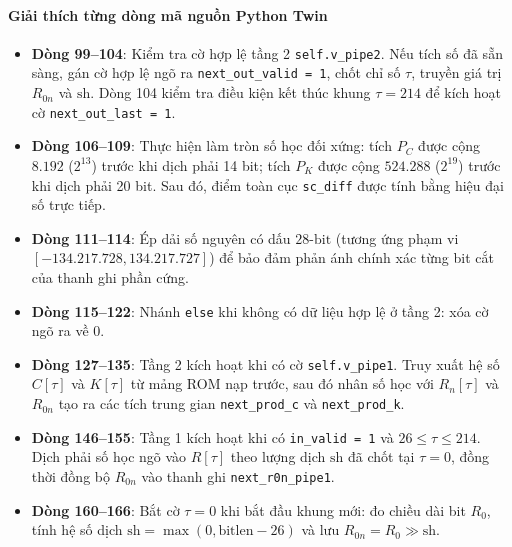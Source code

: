 \paragraph{Giải thích từng dòng mã nguồn Python Twin}
\begin{itemize}[leftmargin=1.5em]
    \item \textbf{Dòng 99--104}: Kiểm tra cờ hợp lệ tầng 2 \texttt{self.v\_pipe2}. Nếu tích số đã sẵn sàng, gán cờ hợp lệ ngõ ra \texttt{next\_out\_valid = 1}, chốt chỉ số $\tau$, truyền giá trị $R_{0n}$ và $\text{sh}$. Dòng 104 kiểm tra điều kiện kết thúc khung $\tau = 214$ để kích hoạt cờ \texttt{next\_out\_last = 1}.
    \item \textbf{Dòng 106--109}: Thực hiện làm tròn số học đối xứng: tích $P_C$ được cộng $8.192$ ($2^{13}$) trước khi dịch phải 14 bit; tích $P_K$ được cộng $524.288$ ($2^{19}$) trước khi dịch phải 20 bit. Sau đó, điểm toàn cục \texttt{sc\_diff} được tính bằng hiệu đại số trực tiếp.
    \item \textbf{Dòng 111--114}: Ép dải số nguyên có dấu $28\text{-bit}$ (tương ứng phạm vi $[-134.217.728, 134.217.727]$) để bảo đảm phản ánh chính xác từng bit cắt của thanh ghi phần cứng.
    \item \textbf{Dòng 115--122}: Nhánh \texttt{else} khi không có dữ liệu hợp lệ ở tầng 2: xóa cờ ngõ ra về 0.
    \item \textbf{Dòng 127--135}: Tầng 2 kích hoạt khi có cờ \texttt{self.v\_pipe1}. Truy xuất hệ số $C[\tau]$ và $K[\tau]$ từ mảng ROM nạp trước, sau đó nhân số học với $R_n[\tau]$ và $R_{0n}$ tạo ra các tích trung gian \texttt{next\_prod\_c} và \texttt{next\_prod\_k}.
    \item \textbf{Dòng 146--155}: Tầng 1 kích hoạt khi có \texttt{in\_valid = 1} và $26 \le \tau \le 214$. Dịch phải số học ngõ vào $R[\tau]$ theo lượng dịch $\text{sh}$ đã chốt tại $\tau = 0$, đồng thời đồng bộ $R_{0n}$ vào thanh ghi \texttt{next\_r0n\_pipe1}.
    \item \textbf{Dòng 160--166}: Bắt cờ $\tau = 0$ khi bắt đầu khung mới: đo chiều dài bit $R_0$, tính hệ số dịch $\text{sh} = \max(0, \text{bitlen} - 26)$ và lưu $R_{0n} = R_0 \gg \text{sh}$.
\end{itemize}

